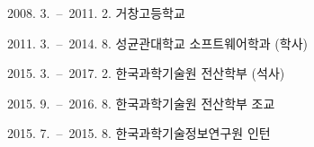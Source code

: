 \documentclass[master,english,final]{kaist-ucs}
\begin{document}
    \begin{education}
        \item[2008. 3.\ --\ 2011. 2.] 거창고등학교
        \item[2011. 3.\ --\ 2014. 8.] 성균관대학교 소프트웨어학과 (학사)
        \item[2015. 3.\ --\ 2017. 2.] 한국과학기술원 전산학부 (석사)
    \end{education}

    \begin{career}
        \item[2015. 9.\ --\ 2016. 8.] 한국과학기술원 전산학부 조교
        \item[2015. 7.\ --\ 2015. 8.] 한국과학기술정보연구원 인턴
    \end{career}



\label{paperlastpagelabel} %
\end{document}
